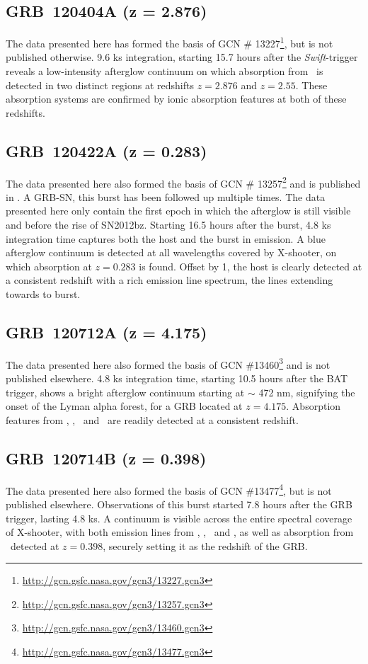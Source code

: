 \documentclass{aa}    %
\begin{document}
\subsection{GRB~120404A (z = 2.876)}
The data presented here has formed the basis of GCN \#
13227\footnote{\url{http://gcn.gsfc.nasa.gov/gcn3/13227.gcn3}}, but is not
published otherwise. 9.6 ks integration, starting 15.7 hours after the
\textit{Swift}-trigger reveals a low-intensity afterglow continuum on which
absorption from \lya~is detected in two distinct regions at redshifts $z=2.876$
and $z=2.55$. These absorption systems are confirmed by ionic absorption
features at both of these redshifts.


\subsection{GRB~120422A (z = 0.283)}
The data presented here also formed the basis of GCN \# 
13257\footnote{\url{http://gcn.gsfc.nasa.gov/gcn3/13257.gcn3}} and is published
in \citet{Schulze2014}. A GRB-SN, this burst has been followed up multiple
times. The data presented here only contain the first epoch in which the
afterglow is still visible and before the rise of SN2012bz. Starting 16.5 hours
after the burst, 4.8 ks integration time captures both the host and the burst
in emission. A blue afterglow continuum is detected at all wavelengths covered
by X-shooter, on which \mgii absorption at $z = 0.283$ is found. Offset by
1, the host is clearly detected at a consistent redshift with a rich
emission line spectrum, the lines extending towards to burst.

\subsection{GRB~120712A (z = 4.175)}
The data presented here also formed the basis of GCN \#13460\footnote{\url{http://gcn.gsfc.nasa.gov/gcn3/13460.gcn3}} and is not
published elsewhere. 4.8 ks integration time, starting 10.5 hours after the BAT
trigger, shows a bright afterglow continuum starting at $\sim$ 472 nm,
signifying the onset of the Lyman alpha forest, for a GRB located at $z =
4.175$. Absorption features from \lya, \feii, \mgii~and \SIii~are readily
detected at a consistent redshift.

\subsection{GRB~120714B (z = 0.398)}
The data presented here also formed the basis of GCN \#13477\footnote{\url{http://gcn.gsfc.nasa.gov/gcn3/13477.gcn3}}, but is not
published elsewhere. Observations of this burst started 7.8 hours after the GRB
trigger, lasting 4.8 ks. A continuum is visible across the entire spectral
coverage of X-shooter, with both emission lines from  \oii, \hb, \oiii~and \ha,
as well as absorption from \mgii~detected at $z = 0.398$, securely setting it
as the redshift of the GRB.
\end{document}
